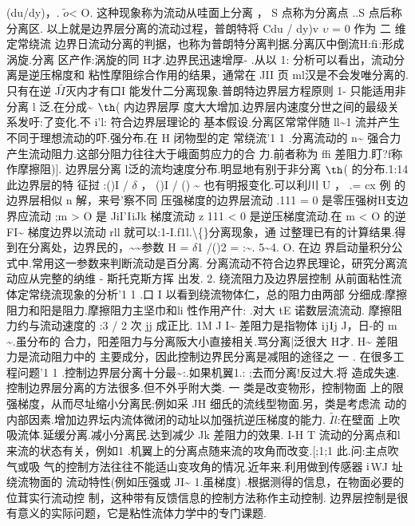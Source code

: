 (du/dy)，. $\tilde{o}$< O. 这种现象称为流动从哇面上分离 ， S 点称为分离点 ..S 点后称分离区. 以上就是边界层分离的流动过程，普朗特将 Cdu / dy)v $\upsilon$ = 0 作为 二 维定常绕流 边界日流动分离的判据，也称为普朗特分离判据.分离仄中倒流H:f${\rm i}$:形成涡旋.分离 区产作:涡旋的同 H才.边界民迅速增厚- .从以 1: 分析可以看出，流动分离是逆压棉度和 粘性摩阻综合作用的结果，通常在 JII 页 ml汉是不会发唯分离的.只有在逆 J$\tilde{I}$灭内才有口I 能发什二分离现象.普朗特边界层方程原则 1- 只能适用非分离 l 泛.在分成\textasciitilde{} ${\rm þ}$( 内边界层厚 度大大增加.边界层内速度分世之间的最级关系发吁:了变化.不 i'l: 符合边界层理论的 基本假设.分离区常常伴随 ll\textasciitilde{}1 流并产生不同于理想流动的吓.强分布.在 H 闭物型的定 常绕流'1 1 .分离流动的 n\textasciitilde{} 强合力产生流动阻力.这部分阻力往往大于峨面剪应力的合 力.前者称为 ffi 差阻力.盯?f称作摩擦阻)]. 边界层分离 l泛的流均速度分布.明显地有别于非分离 ${\rm þ}$( 的分布.1:14 此边界层的特 征挝 :()I / $\delta$ ， ()I / () \textasciitilde{} 也有明报变化.可以利川 U ， .= cx 例 的边界层相似 n 解，来号'察不同 压强梯度的边界层流动 .111 = 0 是零压强树H支边界应流动 ;m > O 是 JiI'${\rm I}$iJk 梯度流动 z 111 < 0 是逆压梯度流动.在 m < O 的逆 FI\textasciitilde{} 梯度边界以流动 rll 就可以:1-I.f1l.\textbackslash\{\}分离现象，通 过整理已有的计算结果.得到在分离处，边界民的，\textasciitilde{}\textasciitilde{}参数 H = $\delta$1 /()2 = :\textasciitilde{}. 5\textasciitilde{}4. O. 在边 界启动量积分公式中.常用这一参数来判断流动是百分离. 分离流动不符合边界民理论，研究分离流动应从完整的纳维 - 斯托克斯方挥 出发. 2. 绕流阻力及边界层控制 从前面粘性流体定常绕流现象的分析'1 1 .口 I 以看到绕流物体仁，总的阻力由两部 分细成:摩擦阻力和阳是阻力.摩擦阻力主坚巾和li 性作用产什: .对大 tE 诺数层流流动. 摩擦阻力约与流动速度的 :3 / 2 次 jj 成正比. 1M J I\textasciitilde{} 差阻力是指物体 ${\rm i}$j${\rm I}$j J，日-的 m \textasciitilde{}.虽分布的 合力，阳差阻力与分离阪大小直接相关.骂分离|泛很大 H才. H\textasciitilde{} 差阻力是流动阻力中的 主要成分，因此控制边界民分离是减阻的途径之 一 . 在很多工程问题'1 1 .控制边界层分离十分最\textasciitilde{}:.如果机翼1.: ;去而分离!反过大.将 造成失速.控制边界层分离的方法很多.但不外乎附大类. 一 类是改变物形，控制物面 上的限强梯度，从而尽址缩小分离民;例如采 JH 细氏的流线型物面.另，类是考虑流 动的内部因素.增加边界坛内流体微闭的动址以加强抗逆压梯度的能力. $\tilde{Il}$:在壁面 上吹吸流体.延缓分离.减小分离民.达到减少 Jk 差阻力的效果. I-H T 流动的分离点和l 来流的状态有关，例如1 .机翼上的分离点随来流的攻角而改变.[;1;1 此.问:主点吹气或吸 气的控制方法往往不能适山变攻角的情况.近年来.利用做到传感器 ${\rm i}$WJ 址绕流物面的 流动特性(例如压强或 JI\textasciitilde{} 1.虽梯度) .根据测得的信息，在物面必要的位茸实行流动控 制，这种带有反馈信息的控制方法称作主动控制. 边界层控制是很有意义的实际问题，它是粘性流体力学中的专门课题.

